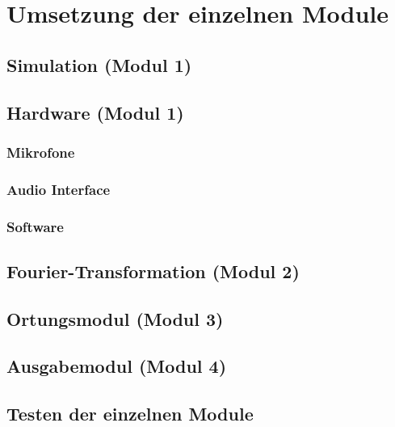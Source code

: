   \section{Umsetzung der einzelnen Module} 
      \subsection{Simulation (Modul 1)}
      \subsection{Hardware (Modul 1)}
      \subsubsection{Mikrofone}
      \subsubsection{Audio Interface}
      \subsubsection{Software}
      \subsection{Fourier-Transformation (Modul 2)}
      \subsection{Ortungsmodul (Modul 3)}
      \subsection{Ausgabemodul (Modul 4)}
      \subsection{Testen der einzelnen Module}
